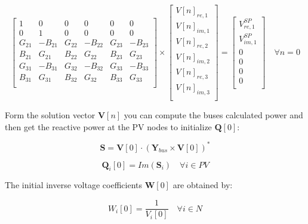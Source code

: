 \documentclass[a4paper,twoside,fleqn]{tufte-book}
\begin{document}
\begin{equation}
\begin{bmatrix}
1 & 0 & 0 & 0 & 0 & 0\\
0 & 1 & 0 & 0 & 0 & 0\\
G_{21} & -B_{21} & G_{22} & -B_{22} & G_{23} & -B_{23}\\
B_{21} & G_{21}  & B_{22} & G_{22}  & B_{23} & G_{23}\\
G_{31} & -B_{31} & G_{32} & -B_{32} & G_{33} & -B_{33}\\
B_{31} & G_{31}  & B_{32} & G_{32}  & B_{33} & G_{33}\\
\end{bmatrix}
\times
\begin{bmatrix}
V[n]_{re, 1}\\
V[n]_{im, 1}\\
V[n]_{re, 2}\\
V[n]_{im, 2}\\
V[n]_{re, 3}\\
V[n]_{im, 3}\\
\end{bmatrix}
=
\begin{bmatrix}
V^{SP}_{re, 1}\\
V^{SP}_{im, 1}\\
0\\
0\\
0\\
0\\
\end{bmatrix}
\quad \forall n = 0
\end{equation}

Form the solution vector $\textbf{V}[n]$ you can compute the buses calculated power and then get the reactive power at the PV nodes to initialize $\textbf{Q}[0]$:

\begin{equation}
\textbf{S} = \textbf{V}[0] \cdot (\textbf{Y}_{bus} \times \textbf{V}[0])^*
\label{Scalc}
\end{equation}

\begin{equation}
\textbf{Q}_i[0] = Im(\textbf{S}_{i}) \quad \forall i \in PV
\end{equation}

The initial inverse voltage coefficients $\textbf{W}[0]$ are obtained by:

\begin{equation}
W_i[0] = \frac{1}{V_i[0]}  \quad \forall i \in N
\end{equation}
\end{document}
